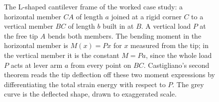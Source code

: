 \begin{figure}[htbp]
\begin{tikzpicture}
\end{tikzpicture}
\caption[Bent cantilever frame for the Castigliano case study]{The
L-shaped cantilever frame of the worked case study: a horizontal member
$CA$ of length $a$ joined at a rigid corner $C$ to a vertical member $BC$
of length $b$ built in at $B$. A vertical load $P$ at the free tip $A$
bends both members. The bending moment in the horizontal member is $M(x)
= P x$ for $x$ measured from the tip; in the vertical member it is the
constant $M = P a$, since the whole load $P$ acts at lever arm $a$ from
every point on $BC$. Castigliano's second theorem reads the tip
deflection off these two moment expressions by differentiating the total
strain energy with respect to $P$. The grey curve is the deflected shape,
drawn to exaggerated scale.}
\label{fig:vol03ch05:castigliano-frame}
\end{figure}
